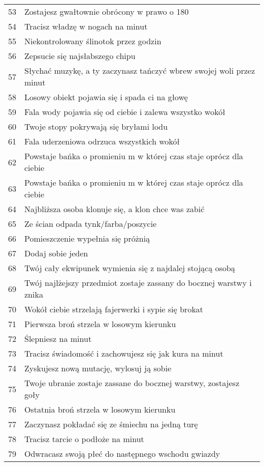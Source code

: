 \begin{longtabu}{ l l }
53			&	Zostajesz gwałtownie obrócony w prawo o 180\textdegree \\
54			&	Tracisz władzę w nogach na \dxx minut \\
55			&	Niekontrolowany ślinotok przez \dvi godzin \\
56			&	Zepsucie się najsłabszego chipu	\\
57			&	Słychać muzykę, a ty zaczynasz tańczyć wbrew swojej woli przez \dvi minut \\
58			&	Losowy obiekt pojawia się i spada ci na głowę \\
59			&	Fala wody pojawia się od ciebie i zalewa wszystko wokół \\
60			&	Twoje stopy pokrywają się bryłami lodu \\
61			&	Fala uderzeniowa odrzuca wszystkich wokół \\
62			&	Powstaje bańka o promieniu \diiii m w której czas staje oprócz dla ciebie \\
63			&	Powstaje bańka o promieniu \dxx m w której czas staje oprócz dla ciebie \\
64			&	Najbliższa osoba klonuje się, a klon chce was zabić \\
65			&	Ze ścian odpada tynk/farba/poszycie \\
66			&	Pomieszczenie wypełnia się próżnią \\
67			&	Dodaj sobie jeden \abnkp \\ 
68			&	Twój cały ekwipunek wymienia się z najdalej stojącą osobą \\
69			&	Twój najlżejszy przedmiot zostaje zassany do bocznej warstwy i znika \\
70			&	Wokół ciebie strzelają fajerwerki i sypie się brokat \\
71			&	Pierwsza broń strzela w losowym kierunku \\
72			&	Ślepniesz na \dvi minut \\
73			&	Tracisz świadomość i zachowujesz się jak kura na \dxx minut \\
74			&	Zyskujesz nową mutację, wylosuj ją sobie \\
75			&	Twoje ubranie zostaje zassane do bocznej warstwy, zostajesz goły \\
76			&	Ostatnia broń strzela w losowym kierunku \\
77			&	Zaczynasz pokładać się ze śmiechu na jedną turę \\
78			&	Tracisz tarcie o podłoże na \diiii minut \\
79			&	Odwracasz swoją płeć do następnego wschodu gwiazdy \\

\end{longtabu}
